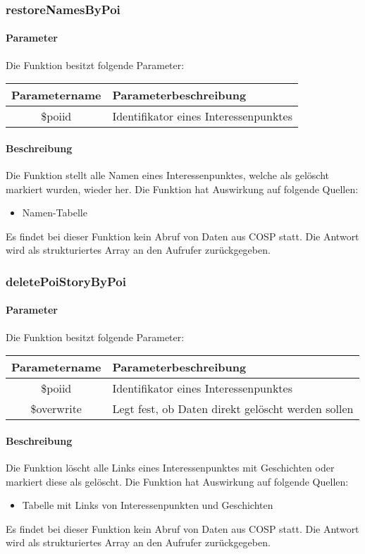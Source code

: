 \subsubsection{restoreNamesByPoi}
\paragraph{Parameter} Die Funktion besitzt folgende Parameter:
\begin{table}[H]
	\begin{tabular}{|c|p{11cm}|}
		\hline
		\textbf{Parametername} & \textbf{Parameterbeschreibung} \\ \hline
		\$poiid     & Identifikator eines Interessenpunktes \\ \hline
	\end{tabular}
\end{table}
\paragraph{Beschreibung} Die Funktion stellt alle Namen eines Interessenpunktes, welche als gelöscht markiert wurden, wieder her. Die Funktion hat Auswirkung auf folgende Quellen:
\begin{itemize}
	\item Namen-Tabelle
\end{itemize}
Es findet bei dieser Funktion kein Abruf von Daten aus {\glqq COSP\grqq} statt. Die Antwort wird als strukturiertes Array an den Aufrufer zurückgegeben.
\subsubsection{deletePoiStoryByPoi}
\paragraph{Parameter} Die Funktion besitzt folgende Parameter:
\begin{table}[H]
	\begin{tabular}{|c|p{11cm}|}
		\hline
		\textbf{Parametername} & \textbf{Parameterbeschreibung} \\ \hline
		\$poiid     & Identifikator eines Interessenpunktes \\ \hline
		\$overwrite & Legt fest, ob Daten direkt gelöscht werden sollen \\ \hline
	\end{tabular}
\end{table}
\paragraph{Beschreibung} Die Funktion löscht alle Links eines Interessenpunktes mit Geschichten oder markiert diese als gelöscht. Die Funktion hat Auswirkung auf folgende Quellen:
\begin{itemize}
	\item Tabelle mit Links von Interessenpunkten und Geschichten
\end{itemize}
Es findet bei dieser Funktion kein Abruf von Daten aus {\glqq COSP\grqq} statt. Die Antwort wird als strukturiertes Array an den Aufrufer zurückgegeben.
